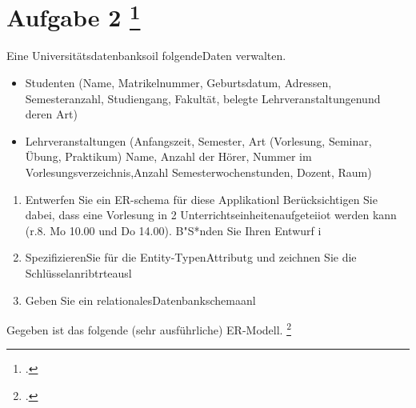 \documentclass{lehramt-informatik-aufgabe}
\begin{document}
\section{Aufgabe 2
\footcite[Aufgabe 2]{examen:66111:1996:03}}

Eine Universitätsdatenbanksoil folgendeDaten verwalten.

\begin{itemize}
\item Studenten (Name, Matrikelnummer, Geburtsdatum, Adressen,
Semesteranzahl, Studiengang, Fakultät, belegte Lehrveranstaltungenund
deren Art)

\item Lehrveranstaltungen (Anfangszeit, Semester, Art (Vorlesung,
Seminar, Übung, Praktikum) Name, Anzahl der Hörer, Nummer im
Vorlesungsverzeichnis,Anzahl Semesterwochenstunden, Dozent, Raum)
\end{itemize}

\begin{enumerate}
\item Entwerfen Sie ein ER-schema für diese Applikationl
Berücksichtigen Sie dabei, dass eine Vorlesung in 2
Unterrichtseinheitenaufgeteiiot werden kann (r.8. Mo 10.00 und Do
14.00). B"S*nden Sie Ihren Entwurf i

\item SpezifizierenSie für die Entity-TypenAttributg und zeichnen Sie
die Schlüsselanribtrteausl

\item Geben Sie ein relationalesDatenbankschemaanl
\end{enumerate}

Gegeben ist das folgende (sehr ausführliche) ER-Modell.
\footcite[Aufgabe 2: Uni-ER-Modell]{db:ab:4}
\end{document}
